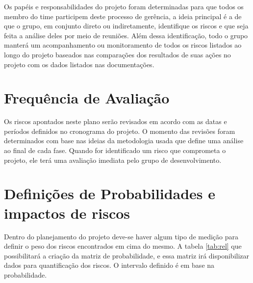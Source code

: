 Os papéis e responsabilidades do projeto foram determinadas para que todos os membro do time participem deste processo de gerência, a ideia principal é a de que o grupo, em conjunto direto ou indiretamente, identifique os riscos e que seja feita a análise deles por meio de reuniões. Além dessa identificação, todo o grupo manterá um acompanhamento ou monitoramento de todos os riscos listados ao longo do projeto baseados nas comparações dos resultados de suas ações no projeto com os dados listados nas documentações.

\section{Frequência de Avaliação}

Os riscos apontados neste plano serão revisados em acordo com as datas e períodos definidos no cronograma do projeto. O momento das revisões foram determinados com base nas ideias da metodologia usada que define uma análise ao final de cada fase. Quando for identificado um risco que comprometa o projeto, ele terá uma avaliação imediata pelo grupo de desenvolvimento.

\section{Definições de Probabilidades e impactos de riscos}

Dentro do planejamento do projeto deve-se haver algum tipo de medição para definir o peso dos riscos encontrados em cima do mesmo. A tabela \ref{tab:rel} que possibilitará a criação da matriz de probabilidade, e essa matriz irá disponibilizar dados para quantificação dos riscos. O intervalo definido é em base na probabilidade.

\begin{table}[!h]
\centering
\caption{Relação entre probabilidade, intervalo e peso}
\label{tab:rel}
\end{table}

